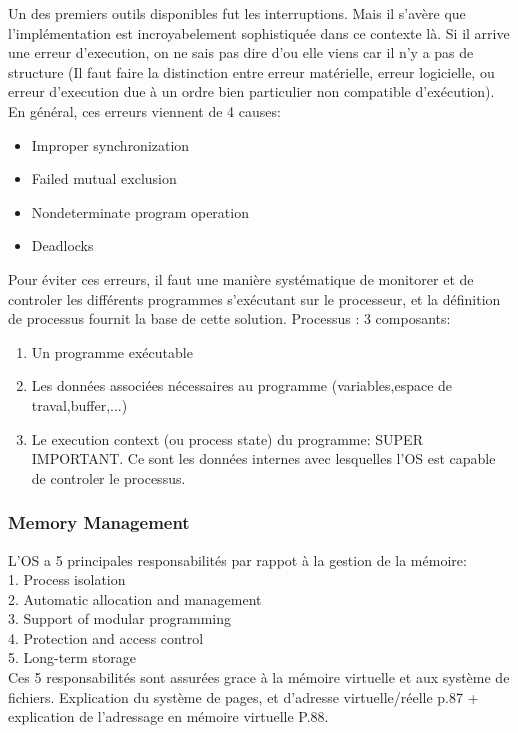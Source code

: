 Un des premiers outils disponibles fut les interruptions. Mais il s’avère que l’implémentation est incroyabelement sophistiquée dans ce contexte là. Si il arrive une erreur d’execution, on ne sais pas dire d’ou elle viens car il n’y a pas de structure (Il faut faire la distinction entre erreur matérielle, erreur logicielle, ou erreur d’execution due à un ordre bien particulier non compatible d’exécution). En général, ces erreurs viennent de 4 causes:
\begin{itemize}
	\item Improper synchronization
	\item Failed mutual exclusion
	\item Nondeterminate program operation
	\item Deadlocks
\end{itemize}

Pour éviter ces erreurs, il faut une manière systématique de monitorer et de controler les différents programmes s’exécutant sur le processeur, et la définition de processus fournit la base de cette solution.
Processus : 3 composants:
\begin{enumerate}
	\item Un programme exécutable
	\item Les données associées nécessaires au programme (variables,espace de traval,buffer,...)
	\item Le execution context (ou process state) du programme: SUPER IMPORTANT. Ce sont les données internes avec lesquelles l’OS est capable de controler le processus.
\end{enumerate}


\subsubsection{Memory Management}
L’OS a 5 principales responsabilités par rappot à la gestion de la mémoire: \\
1. Process isolation \\
2. Automatic allocation and management \\
3. Support of modular programming \\
4. Protection and access control \\
5. Long-term storage \\
Ces 5 responsabilités sont assurées grace à la mémoire virtuelle et aux système de fichiers. Explication du système de pages, et d’adresse virtuelle/réelle p.87 + explication de l’adressage en mémoire virtuelle P.88.

